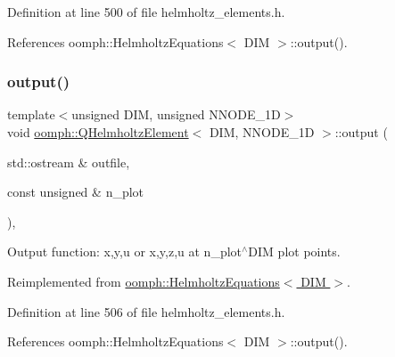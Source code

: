 Definition at line 500 of file helmholtz\+\_\+elements.\+h.



References oomph\+::\+Helmholtz\+Equations$<$ D\+I\+M $>$\+::output().

\mbox{\label{classoomph_1_1QHelmholtzElement_ac05323b02dc7d06f506ade8078fa2356}} 
\subsubsection{\texorpdfstring{output()}{output()}\hspace{0.1cm}{\footnotesize\ttfamily [2/4]}}
{\footnotesize\ttfamily template$<$unsigned D\+IM, unsigned N\+N\+O\+D\+E\+\_\+1D$>$ \\
void \hyperlink{classoomph_1_1QHelmholtzElement}{oomph\+::\+Q\+Helmholtz\+Element}$<$ D\+IM, N\+N\+O\+D\+E\+\_\+1D $>$\+::output (\begin{DoxyParamCaption}\item[{std\+::ostream \&}]{outfile,  }\item[{const unsigned \&}]{n\+\_\+plot }\end{DoxyParamCaption})\hspace{0.3cm}{\ttfamily [inline]}, {\ttfamily [virtual]}}



Output function\+: x,y,u or x,y,z,u at n\+\_\+plot$^\wedge$\+D\+IM plot points. 



Reimplemented from \hyperlink{classoomph_1_1HelmholtzEquations_a63c04aa6b9ee38cb75417b2de9e45f24}{oomph\+::\+Helmholtz\+Equations$<$ D\+I\+M $>$}.



Definition at line 506 of file helmholtz\+\_\+elements.\+h.



References oomph\+::\+Helmholtz\+Equations$<$ D\+I\+M $>$\+::output().

\mbox{\label{classoomph_1_1QHelmholtzElement_ac30733fd570c0f78f87ed4a7c542cc5a}} 
